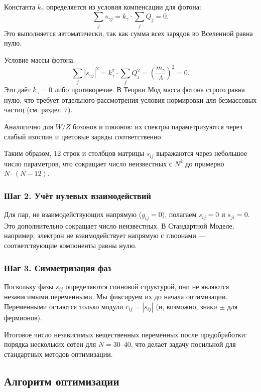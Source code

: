 \documentclass[12pt,a4paper]{article}
\begin{document}
Константа $k_\gamma$ определяется из условия компенсации для фотона:
\begin{equation}
    \sum_j s_{\gamma j} = k_\gamma \cdot \sum_j Q_j = 0.
\end{equation}
Это выполняется автоматически, так как сумма всех зарядов во Вселенной равна нулю.

Условие массы фотона:
\begin{equation}
    \sum_j |s_{\gamma j}|^2 = k_\gamma^2 \cdot \sum_j Q_j^2 = \left( \frac{m_\gamma}{\Lambda} \right)^2 = 0.
\end{equation}
Это даёт $k_\gamma = 0$ либо противоречие. В Теории Мод масса фотона строго равна нулю, что требует отдельного рассмотрения условия нормировки для безмассовых частиц (см. раздел~7).

Аналогично для $W/Z$ бозонов и глюонов: их спектры параметризуются через слабый изоспин и цветовые заряды соответственно.

Таким образом, 12 строк и столбцов матрицы $s_{ij}$ выражаются через небольшое число параметров, что сокращает число неизвестных с $N^2$ до примерно $N \cdot (N-12)$.

\subsubsection{Шаг 2. Учёт нулевых взаимодействий}
Для пар, не взаимодействующих напрямую ($g_{ij} = 0$), полагаем $s_{ij} = 0$ и $s_{ji} = 0$. Это дополнительно сокращает число неизвестных. В Стандартной Моделе, например, электрон не взаимодействует напрямую с глюонами --- соответствующие компоненты равны нулю.

\subsubsection{Шаг 3. Симметризация фаз}
Поскольку фазы $s_{ij}$ определяются спиновой структурой, они не являются независимыми переменными. Мы фиксируем их до начала оптимизации. Переменными остаются только модули $r_{ij} = |s_{ij}|$ (и, возможно, знаки $\pm$ для фермионов).

Итоговое число независимых вещественных переменных после предобработки: порядка нескольких сотен для $N = 30$--$40$, что делает задачу посильной для стандартных методов оптимизации.

\subsection{Алгоритм оптимизации}
\end{document}
